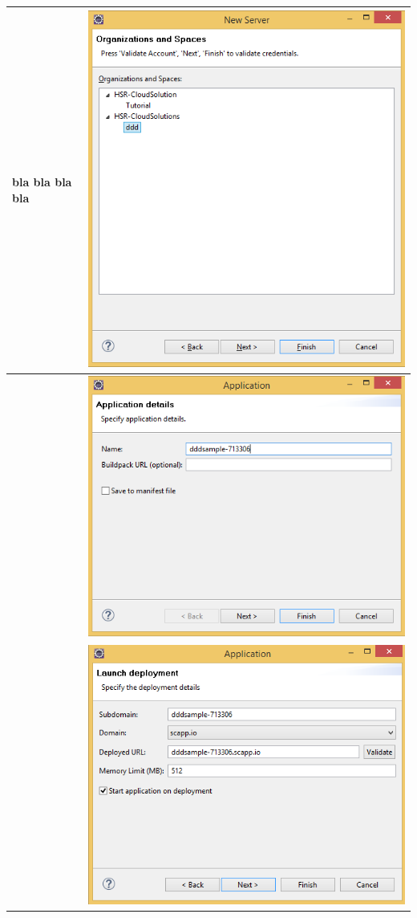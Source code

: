 \begin{longtable}{| p{5cm} | p{11cm} |}
 \\ \hline 
bla bla bla bla
&\includegraphics[width=0.65\columnwidth, valign=T]{images/ddd_cloud_deployment/4.png}
 \\ \hline
&\includegraphics[width=0.65\columnwidth, valign=T]{images/ddd_cloud_deployment/5.png}
 \\ \hline
&\includegraphics[width=0.65\columnwidth, valign=T]{images/ddd_cloud_deployment/6.png}

\end{longtable}
